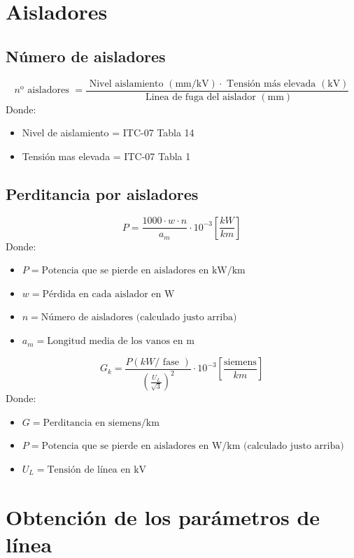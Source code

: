 \documentclass[10pt,a4paper]{article}
\begin{document}
\newpage
\section{Aisladores} 
\subsection{Número de aisladores}
$$
n^{\mathrm{o}} \text { aisladores }=\frac{\text { Nivel aislamiento }(\mathrm{mm} / \mathrm{kV}) \cdot \text { Tensión más elevada }(\mathrm{kV})}{\text { Linea de fuga del aislador }(\mathrm{mm})}
$$
Donde:
\begin{itemize}
    \item Nivel de aislamiento = ITC-07 Tabla 14
    \item Tensión mas elevada = ITC-07 Tabla 1
\end{itemize}

\subsection{Perditancia por aisladores}
$$
P=\frac{1000 \cdot w \cdot n}{a_{m}}\cdot 10^{-3} [\frac{kW}{km}]
$$
Donde:
\begin{itemize}
    \item $P = \text{Potencia que se pierde en aisladores en kW/km}$
    \item $w = \text{Pérdida en cada aislador en W}$
    \item $n = \text{Número de aisladores (calculado justo arriba)}$
    \item $a_m = \text{Longitud media de los vanos en m}$
\end{itemize}

$$
G_k=\frac{P(k W / \text { fase })}{\left(\frac{U_{L}}{\sqrt{3}}\right)^{2}} \cdot 10^{-3} [\frac{\text{siemens}}{km}]
$$
Donde:
\begin{itemize}
    \item $G = \text{Perditancia en siemens/km}$
    \item $P = \text{Potencia que se pierde en aisladores en W/km (calculado justo arriba)}$
    \item $U_L = \text{Tensión de línea en kV}$
\end{itemize}
\section{Obtención de los parámetros de línea}
\end{document}
